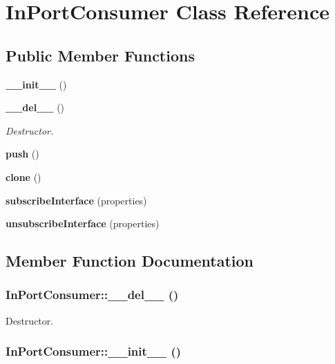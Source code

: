 \section{In\-Port\-Consumer Class Reference}
\label{classInPortConsumer}
\subsection*{Public Member Functions}
\begin{CompactItemize}
\item 
{\bf \_\-\_\-init\_\-\_\-} ()
\item 
{\bf \_\-\_\-del\_\-\_\-} ()
\begin{CompactList}\small\item\em Destructor. \item\end{CompactList}\item 
{\bf push} ()
\item 
{\bf clone} ()
\item 
{\bf subscribe\-Interface} (properties)
\item 
{\bf unsubscribe\-Interface} (properties)
\end{CompactItemize}


\subsection{Member Function Documentation}
\subsubsection{\setlength{\rightskip}{0pt plus 5cm}In\-Port\-Consumer::\_\-\_\-del\_\-\_\- ()}\label{classInPortConsumer_InPortConsumera1}


Destructor. 

\subsubsection{\setlength{\rightskip}{0pt plus 5cm}In\-Port\-Consumer::\_\-\_\-init\_\-\_\- ()}\label{classInPortConsumer_InPortConsumera0}


